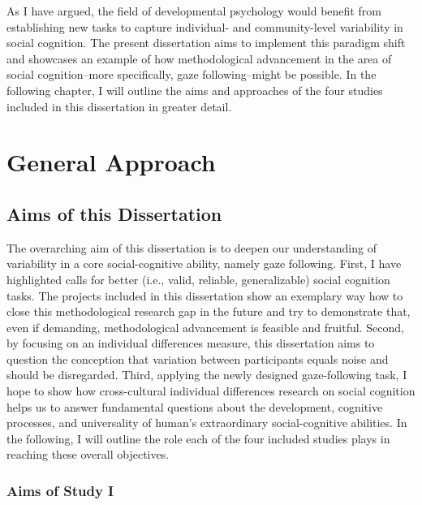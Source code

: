 \documentclass[
]{scrbook}
\begin{document}
As I have argued, the field of developmental psychology would benefit from establishing new tasks to capture individual- and community-level variability in social cognition. The present dissertation aims to implement this paradigm shift and showcases an example of how methodological advancement in the area of social cognition\thinspace --\thinspace more specifically, gaze following\thinspace --\thinspace might be possible. In the following chapter, I will outline the aims and approaches of the four studies included in this dissertation in greater detail.

\chapter{General Approach}\label{approach}

\section{Aims of this Dissertation}\label{aims-general}

The overarching aim of this dissertation is to deepen our understanding of variability in a core social-cognitive ability, namely gaze following. First, I have highlighted calls for better (i.e., valid, reliable, generalizable) social cognition tasks. The projects included in this dissertation show an exemplary way how to close this methodological research gap in the future and try to demonstrate that, even if demanding, methodological advancement is feasible and fruitful. Second, by focusing on an individual differences measure, this dissertation aims to question the conception that variation between participants equals noise and should be disregarded. Third, applying the newly designed gaze-following task, I hope to show how cross-cultural individual differences research on social cognition helps us to answer fundamental questions about the development, cognitive processes, and universality of human's extraordinary social-cognitive abilities. In the following, I will outline the role each of the four included studies plays in reaching these overall objectives.

\subsection{Aims of Study I}\label{aims-studyI}
\end{document}

